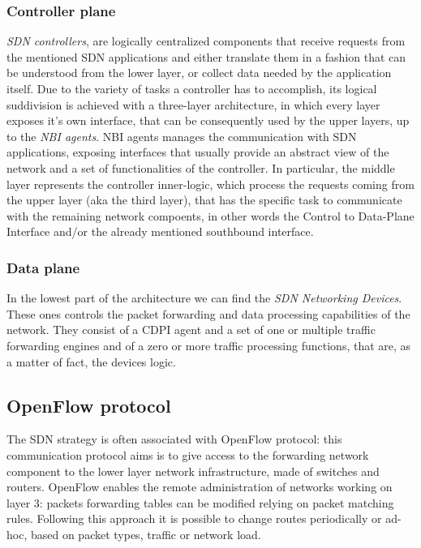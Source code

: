 \subsubsection{Controller plane}

\emph{SDN controllers}, are logically centralized components that
receive requests from the mentioned SDN applications and either translate them 
in a fashion that can be understood from the lower layer, or collect 
data needed by the application itself. 
Due to the variety of tasks a controller has to accomplish, its logical 
suddivision is achieved with a three-layer architecture, in which every layer 
exposes it's own interface, that can be consequently used by the upper 
layers, up to the \emph{NBI agents}.
NBI agents manages the communication with SDN applications, exposing interfaces that usually provide an abstract view of the network and a set of functionalities of the controller.
In particular, the middle layer represents the controller inner-logic, which 
process the requests coming from the upper layer (aka the third layer), that 
has the specific task to communicate with the remaining network compoents, in 
other words the Control to Data-Plane Interface and/or the already 
mentioned southbound interface.

\subsubsection{Data plane}

In the lowest part of the architecture we can find the \emph{SDN Networking 
Devices}. These ones controls the packet forwarding and data processing 
capabilities of the network. They consist of a CDPI agent and a set of one or 
multiple traffic forwarding engines and of a zero or more traffic processing 
functions, that are, as a matter of fact, the devices logic.

\subsection{OpenFlow protocol}
The SDN strategy is often associated with OpenFlow protocol: this communication
protocol aims is to give access to the forwarding network component to the lower
layer network infrastructure, made of switches and routers. OpenFlow enables
the remote administration of networks working on layer 3: packets forwarding
tables can be modified relying on packet matching rules. Following this
approach it is possible to change routes periodically or ad-hoc, based on
packet types, traffic or network load.

